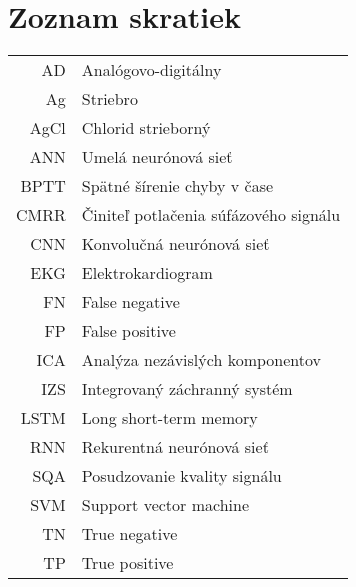 \documentclass[slovak,master,unicode,oneside,bw]{ctufit-thesis}
\theoremstyle{plain}
\theoremstyle{definition}
\theoremstyle{remark}
\numberwithin{theorem}{chapter}
\begin{document}
\chapter{Zoznam skratiek}
	
\begin{tabular}{rl}
AD & Analógovo-digitálny\\
Ag & Striebro\\
AgCl & Chlorid strieborný\\
ANN & Umelá neurónová sieť\\
BPTT & Spätné šírenie chyby v čase\\
CMRR & Činiteľ potlačenia súfázového signálu\\
CNN & Konvolučná neurónová sieť\\
EKG & Elektrokardiogram\\
FN & False negative\\
FP & False positive\\
ICA & Analýza nezávislých komponentov\\
IZS & Integrovaný záchranný systém\\
LSTM & Long short-term memory\\
RNN & Rekurentná neurónová sieť\\
SQA & Posudzovanie kvality signálu\\
SVM & Support vector machine\\
TN & True negative\\
TP & True positive\\
\end{tabular}

\mainmatter\mainmatterinit %



\appendix\appendixinit %


\backmatter %

\printbibliography %

\end{document}
